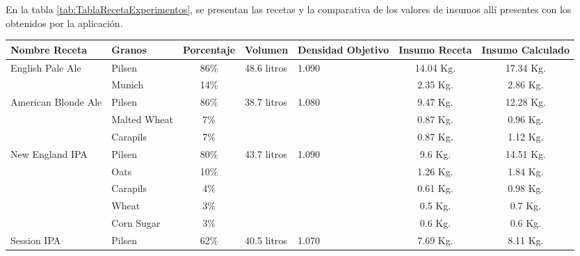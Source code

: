 En la tabla \ref{tab:TablaRecetaExperimentos}, se presentan las recetas y la comparativa de los valores de insumos allí presentes con los obtenidos por la aplicación.
\begin{table}[h]
    \centering
    \begin{tabularx}{\textwidth}{|X|X|X|X|X|X|X|}
    \hline
        Nombre Receta & Granos & Porcentaje & Volumen & Densidad Objetivo & Insumo Receta & Insumo Calculado \\
        \hline
        \hline
        \multirow{2}{2cm}{English Pale Ale} & Pilsen &\multicolumn{1}{c|}{86\%}  &\multirow{2}{2cm}{48.6 litros}  &\multirow{2}{2cm}{1.090} & \multicolumn{1}{c|}{14.04 Kg.} & \multicolumn{1}{c|}{17.34 Kg.}\\
         & Munich & \multicolumn{1}{c|}{14\%} & & &\multicolumn{1}{c|}{2.35 Kg.} &\multicolumn{1}{c|}{2.86 Kg.} \\
        \hline
        \multirow{3}{2cm}{American Blonde Ale} & Pilsen &\multicolumn{1}{c|}{86\%}  &\multirow{3}{2cm}{38.7 litros}  &\multirow{3}{2cm}{1.080} & \multicolumn{1}{c|}{9.47 Kg.} & \multicolumn{1}{c|}{12.28 Kg.}\\
         & Malted Wheat & \multicolumn{1}{c|}{7\%} & & &\multicolumn{1}{c|}{0.87 Kg.} &\multicolumn{1}{c|}{0.96 Kg.}\\ 
         & Carapils & \multicolumn{1}{c|}{7\%} & & & \multicolumn{1}{c|}{0.87 Kg.} &\multicolumn{1}{c|}{1.12 Kg.} \\
        \hline
        \multirow{5}{2cm}{New England IPA} & Pilsen &\multicolumn{1}{c|}{80\%}  &\multirow{5}{2cm}{43.7 litros}  &\multirow{5}{2cm}{1.090} & \multicolumn{1}{c|}{9.6 Kg.} & \multicolumn{1}{c|}{14.51 Kg.}\\
         & Oats & \multicolumn{1}{c|}{10\%} & & &\multicolumn{1}{c|}{1.26 Kg.} &\multicolumn{1}{c|}{1.84 Kg.} \\
        & Carapils & \multicolumn{1}{c|}{4\%} & & &\multicolumn{1}{c|}{0.61 Kg.} &\multicolumn{1}{c|}{0.98 Kg.} \\
        & Wheat & \multicolumn{1}{c|}{3\%} & & &\multicolumn{1}{c|}{0.5 Kg.} &\multicolumn{1}{c|}{0.7 Kg.} \\
        & Corn Sugar & \multicolumn{1}{c|}{3\%} & & &\multicolumn{1}{c|}{0.6 Kg.} &\multicolumn{1}{c|}{0.6 Kg.} \\
        \hline
        \multirow{4}{2cm}{Session IPA} & Pilsen &\multicolumn{1}{c|}{62\%}  &\multirow{4}{2cm}{40.5 litros}  &\multirow{4}{2cm}{1.070} & \multicolumn{1}{c|}{7.69 Kg.} & \multicolumn{1}{c|}{8.11 Kg.}\\

\end{tabularx}
\end{table}
